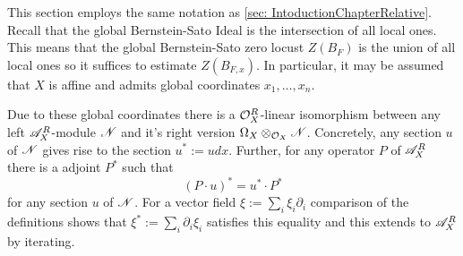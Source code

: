 This section employs the same notation as \cref{sec: IntoductionChapterRelative}. Recall that the global Bernstein-Sato Ideal is the intersection of all local ones.
This means that the global Bernstein-Sato zero locust $Z(B_F)$ is the union of all local ones so it suffices to estimate $Z(B_{F,x})$.
In particular, it may be assumed that $X$ is affine and admits global coordinates $x_1,\ldots,x_n$.

Due to these global coordinates there is a $\mathcal{O}_X^R$-linear isomorphism between any left $\mathscr{A}_X^R$-module $\mathscr{N}$ and it's right version $\Omega_X \otimes_{\mathcal{O}_X}\mathscr{N}$. Concretely, any section $u$ of $\mathscr{N}$ gives rise to the section $u^* := u dx$. Further, for any operator $P$ of $\mathscr{A}_X^R$ there is a adjoint $P^*$ such that
$$(P\cdot u)^* =   u^* \cdot P^*$$
for any section $u$ of $\mathscr{N}$. For a vector field $\xi := \sum_i\xi_i \partial_i$ comparison of the definitions shows that $\xi^* := \sum_i\partial_i\xi_i$ satisfies this equality and this extends to $\mathscr{A}_X^R$ by iterating.

